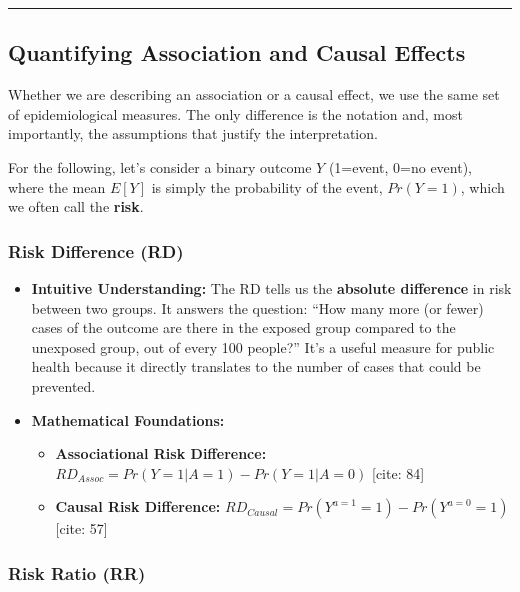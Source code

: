 \documentclass[
  10pt,
  letterpaper,
  DIV=11,
  numbers=noendperiod]{scrartcl}
\providecommand{\tightlist}{%
  \setlength{\itemsep}{0pt}\setlength{\parskip}{0pt}}
\begin{document}
\begin{center}\rule{0.5\linewidth}{0.5pt}\end{center}

\subsection{Quantifying Association and Causal
Effects}\label{quantifying-association-and-causal-effects}

Whether we are describing an association or a causal effect, we use the
same set of epidemiological measures. The only difference is the
notation and, most importantly, the assumptions that justify the
interpretation.

For the following, let's consider a binary outcome \(Y\) (1=event, 0=no
event), where the mean \(E[Y]\) is simply the probability of the event,
\(Pr(Y=1)\), which we often call the \textbf{risk}.

\subsubsection{Risk Difference (RD)}\label{risk-difference-rd}

\begin{itemize}
\tightlist
\item
  \textbf{Intuitive Understanding:} The RD tells us the \textbf{absolute
  difference} in risk between two groups. It answers the question: ``How
  many more (or fewer) cases of the outcome are there in the exposed
  group compared to the unexposed group, out of every 100 people?'' It's
  a useful measure for public health because it directly translates to
  the number of cases that could be prevented.
\item
  \textbf{Mathematical Foundations:}

  \begin{itemize}
  \tightlist
  \item
    \textbf{Associational Risk Difference:}
    \(RD_{Assoc} = Pr(Y=1|A=1) - Pr(Y=1|A=0)\) {[}cite: 84{]}
  \item
    \textbf{Causal Risk Difference:}
    \(RD_{Causal} = Pr(Y^{a=1}=1) - Pr(Y^{a=0}=1)\) {[}cite: 57{]}
  \end{itemize}
\end{itemize}

\subsubsection{Risk Ratio (RR)}\label{risk-ratio-rr}
\end{document}
